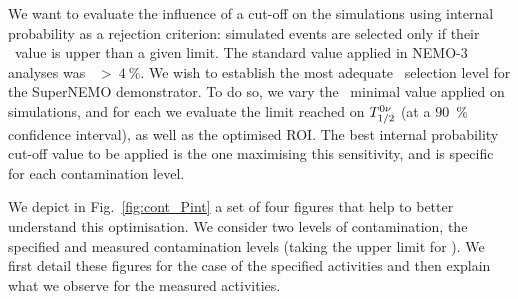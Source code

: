 We want to evaluate the influence of a cut-off on the simulations using internal probability as a rejection criterion: simulated events are selected only if their \Pint\ value is upper than a given limit.
The standard value applied in NEMO-$3$ analyses was \Pint~$>~4~\%$.
We wish to establish the most adequate \Pint\ selection level for the SuperNEMO demonstrator.
To do so, we vary the \Pint\ minimal value applied on simulations, and for each we evaluate the limit reached on $T_{1/2}^{0\nu}$ (at a $90$~\% confidence interval), as well as the optimised ROI.
The best internal probability cut-off value to be applied is the one maximising this sensitivity, and is specific for each contamination level.

We depict in Fig.~\ref{fig:cont_Pint} a set of four figures that help to better understand this optimisation.
We consider two levels of contamination, the specified and measured contamination levels (taking the upper limit for \Bi).
We first detail these figures for the case of the specified activities and then explain what we observe for the measured activities.
